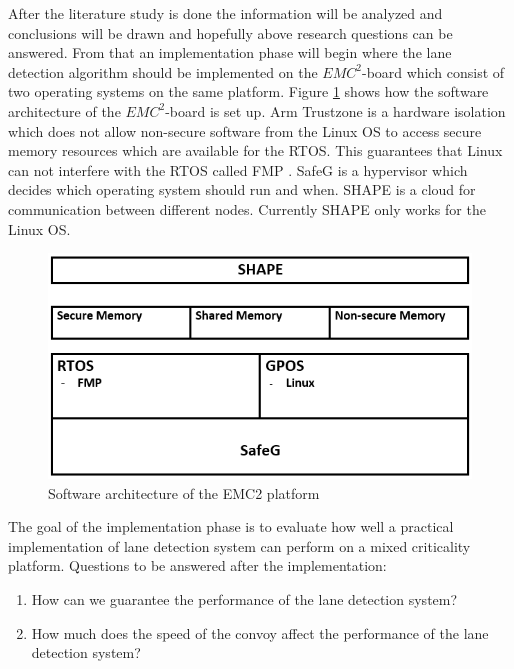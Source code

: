 After the literature study is done the information will be analyzed and conclusions will be drawn and hopefully above research questions can be answered. From that an implementation phase will begin where the lane detection algorithm should be implemented on the $EMC^2$-board which consist of two operating systems on the same platform. Figure \ref{fig:Software architecture of the EMC2 platform} shows how the software architecture of the $EMC^2$-board is set up. Arm Trustzone is a hardware isolation which does not allow non-secure software from the Linux OS to access secure memory resources which are available for the RTOS. This guarantees that Linux can not interfere with the RTOS called FMP \cite{zaki2016}. SafeG is a hypervisor which decides which operating system should run and when. SHAPE is a cloud for communication between different nodes. Currently SHAPE only works for the Linux OS.


\begin{figure}[H]
  \includegraphics[width=\textwidth]{./img/architecture.png}
  \centering
  \caption{Software architecture of the EMC2 platform}
  \label{fig:Software architecture of the EMC2 platform}
\end{figure}

The goal of the implementation phase is to evaluate how well a practical implementation of lane detection system can perform on a mixed criticality platform. Questions to be answered after the implementation:

\begin{enumerate}  
\item How can we guarantee the performance of the lane detection system?
\item How much does the speed of the convoy affect the performance of the lane detection system?
\end{enumerate}

